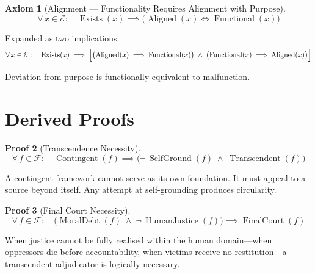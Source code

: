 \documentclass[11pt,a4paper]{article}
\theoremstyle{definition}
\newtheorem{axiom}{Axiom}
\newtheorem{proof_thm}[axiom]{Proof}
\newcommand{\E}{\mathcal{E}}      %
\newcommand{\F}{\mathcal{F}}      %
\newcommand{\Exists}{\operatorname{Exists}}
\newcommand{\Aligned}{\operatorname{Aligned}}
\newcommand{\Functional}{\operatorname{Functional}}
\newcommand{\Contingent}{\operatorname{Contingent}}
\newcommand{\SelfGround}{\operatorname{SelfGround}}
\newcommand{\Transcendent}{\operatorname{Transcendent}}
\newcommand{\MoralDebt}{\operatorname{MoralDebt}}
\newcommand{\HumanJustice}{\operatorname{HumanJustice}}
\newcommand{\FinalCourt}{\operatorname{FinalCourt}}
\begin{document}
\begin{axiom}[Alignment --- Functionality Requires Alignment with Purpose]
\label{ax:alignment}
\begin{equation}
\forall\, x \in \E : \quad \Exists(x) \implies
\bigl(\Aligned(x) \iff \Functional(x)\bigr)
\end{equation}

Expanded as two implications:
\begin{equation}
\forall\, x \in \E : \quad \Exists(x) \implies
\Bigl[
    \bigl(\Aligned(x) \implies \Functional(x)\bigr)
    \;\land\;
    \bigl(\Functional(x) \implies \Aligned(x)\bigr)
\Bigr]
\end{equation}

Deviation from purpose is functionally equivalent to malfunction.
\end{axiom}

\section{Derived Proofs}

\begin{proof_thm}[Transcendence Necessity]
\label{pf:transcendence}
\begin{equation}
\forall\, f \in \F : \quad \Contingent(f) \implies
\bigl(\lnot\,\SelfGround(f) \;\land\; \Transcendent(f)\bigr)
\end{equation}

A contingent framework cannot serve as its own foundation.  It must appeal to
a source beyond itself.  Any attempt at self-grounding produces circularity.
\end{proof_thm}

\begin{proof_thm}[Final Court Necessity]
\label{pf:finalcourt}
\begin{equation}
\forall\, f \in \F : \quad
\bigl(\MoralDebt(f) \;\land\; \lnot\,\HumanJustice(f)\bigr) \implies \FinalCourt(f)
\end{equation}

When justice cannot be fully realised within the human domain---when oppressors
die before accountability, when victims receive no restitution---a transcendent
adjudicator is logically necessary.
\end{proof_thm}

\end{document}
